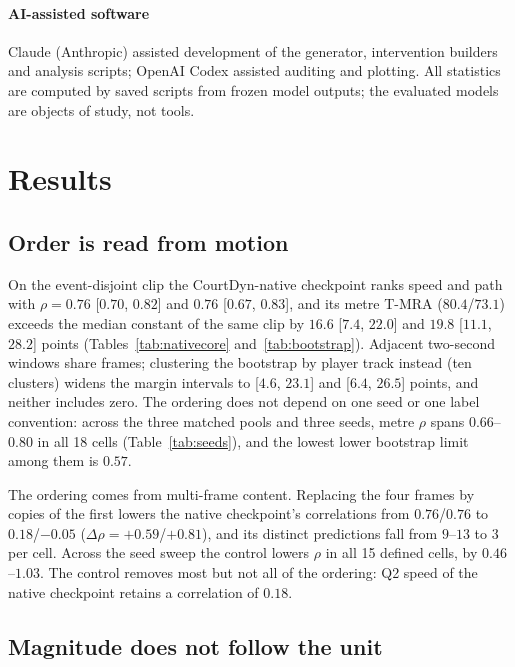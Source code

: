 \documentclass[preprint,number]{elsarticle}
\begin{document}
\paragraph{AI-assisted software}
Claude (Anthropic) assisted development of the generator, intervention
builders and analysis scripts; OpenAI Codex assisted auditing and plotting.
All statistics are computed by saved scripts from frozen model outputs; the
evaluated models are objects of study, not tools.

\section{Results}
\label{sec:results}

\subsection{Order is read from motion}
\label{sec:order}

On the event-disjoint clip the CourtDyn-native checkpoint ranks speed and path
with $\rho=0.76$ [$0.70$, $0.82$] and $0.76$ [$0.67$, $0.83$], and its metre
T-MRA ($80.4$/$73.1$) exceeds the median constant of the same clip by $16.6$
[$7.4$, $22.0$] and $19.8$ [$11.1$, $28.2$] points (Tables~\ref{tab:nativecore}
and~\ref{tab:bootstrap}). Adjacent two-second windows share frames; clustering
the bootstrap by player track instead (ten clusters) widens the margin
intervals to [$4.6$, $23.1$] and [$6.4$, $26.5$] points, and neither includes
zero. The ordering does not depend on one seed or one label
convention: across the three matched pools and three seeds, metre $\rho$ spans
$0.66$--$0.80$ in all 18 cells (Table~\ref{tab:seeds}), and the lowest lower
bootstrap limit among them is $0.57$.

The ordering comes from multi-frame content. Replacing the four frames by
copies of the first lowers the native checkpoint's correlations from
$0.76$/$0.76$ to $0.18$/$-0.05$ ($\Delta\rho=+0.59$/$+0.81$), and its distinct
predictions fall from $9$--$13$ to $3$ per cell. Across the seed sweep the
control lowers $\rho$ in all 15 defined cells, by $0.46$--$1.03$. The control
removes most but not all of the ordering: Q2 speed of the native checkpoint
retains a correlation of $0.18$.

\subsection{Magnitude does not follow the unit}
\label{sec:units}
\end{document}
